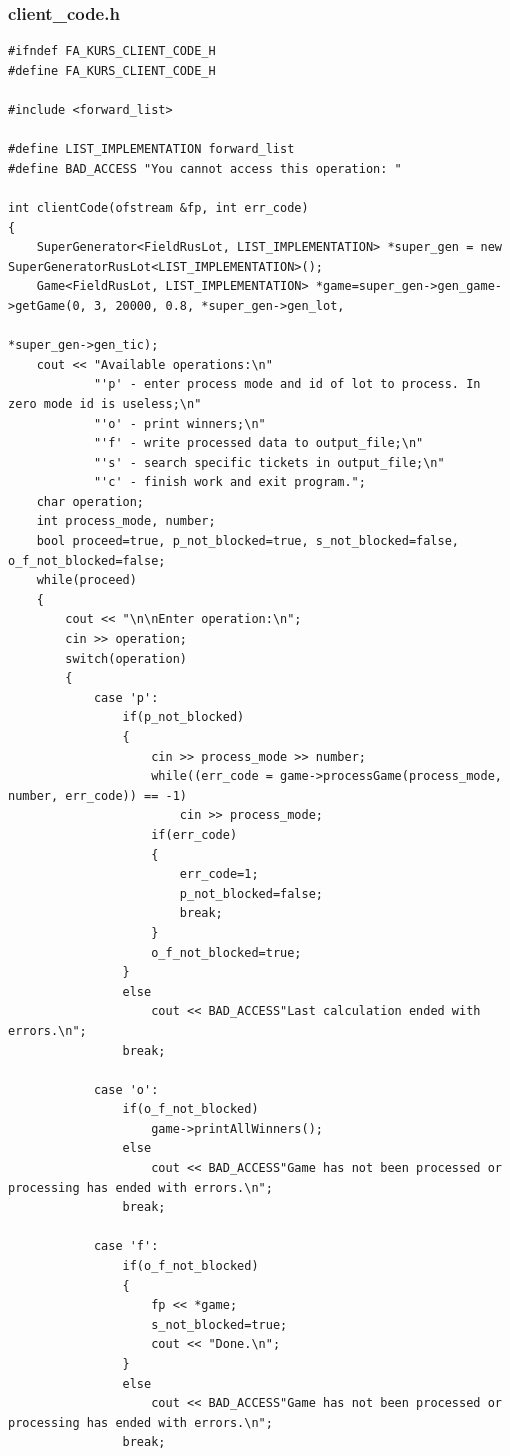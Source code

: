 \documentclass[a4paper,14pt]{article}
\begin{document}
\subsubsection{client\_code.h}
\begin{verbatim}
#ifndef FA_KURS_CLIENT_CODE_H
#define FA_KURS_CLIENT_CODE_H

#include <forward_list>

#define LIST_IMPLEMENTATION forward_list
#define BAD_ACCESS "You cannot access this operation: "

int clientCode(ofstream &fp, int err_code)
{
    SuperGenerator<FieldRusLot, LIST_IMPLEMENTATION> *super_gen = new SuperGeneratorRusLot<LIST_IMPLEMENTATION>();
    Game<FieldRusLot, LIST_IMPLEMENTATION> *game=super_gen->gen_game->getGame(0, 3, 20000, 0.8, *super_gen->gen_lot,
                                                                              *super_gen->gen_tic);
    cout << "Available operations:\n"
            "'p' - enter process mode and id of lot to process. In zero mode id is useless;\n"
            "'o' - print winners;\n"
            "'f' - write processed data to output_file;\n"
            "'s' - search specific tickets in output_file;\n"
            "'c' - finish work and exit program.";
    char operation;
    int process_mode, number;
    bool proceed=true, p_not_blocked=true, s_not_blocked=false, o_f_not_blocked=false;
    while(proceed)
    {
        cout << "\n\nEnter operation:\n";
        cin >> operation;
        switch(operation)
        {
            case 'p':
                if(p_not_blocked)
                {
                    cin >> process_mode >> number;
                    while((err_code = game->processGame(process_mode, number, err_code)) == -1)
                        cin >> process_mode;
                    if(err_code)
                    {
                        err_code=1;
                        p_not_blocked=false;
                        break;
                    }
                    o_f_not_blocked=true;
                }
                else
                    cout << BAD_ACCESS"Last calculation ended with errors.\n";
                break;

            case 'o':
                if(o_f_not_blocked)
                    game->printAllWinners();
                else
                    cout << BAD_ACCESS"Game has not been processed or processing has ended with errors.\n";
                break;

            case 'f':
                if(o_f_not_blocked)
                {
                    fp << *game;
                    s_not_blocked=true;
                    cout << "Done.\n";
                }
                else
                    cout << BAD_ACCESS"Game has not been processed or processing has ended with errors.\n";
                break;


\end{verbatim}
\end{document}
